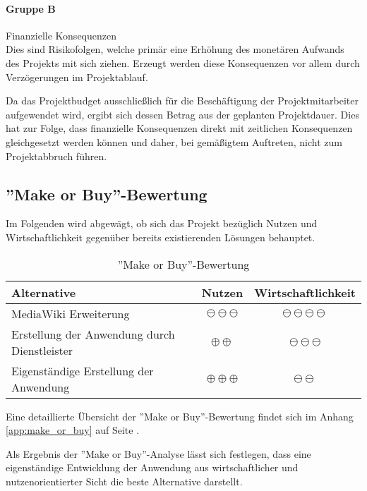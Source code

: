 \documentclass[12pt, xcolor=dvipsnames]{scrartcl}
\begin{document}
\paragraph{Gruppe B} Finanzielle Konsequenzen \\
Dies sind Risikofolgen, welche primär eine Erhöhung des monetären Aufwands des Projekts mit sich ziehen. Erzeugt werden diese Konsequenzen vor allem durch Verzögerungen im Projektablauf.

Da das Projektbudget ausschließlich für die Beschäftigung der Projektmitarbeiter aufgewendet wird, ergibt sich dessen Betrag aus der geplanten Projektdauer. Dies hat zur Folge, dass finanzielle Konsequenzen direkt mit zeitlichen Konsequenzen gleichgesetzt werden können und daher, bei gemäßigtem Auftreten, nicht zum Projektabbruch führen.


\subsection{''Make or Buy''-Bewertung}

Im Folgenden wird abgewägt, ob sich das Projekt bezüglich Nutzen und Wirtschaftlichkeit gegenüber bereits existierenden Lösungen behauptet.


\begin{table}[H]
	\centering
	\begin{tabular}{lcc}

		\rowcolor{white!15}				
		\textbf{Alternative} & \textbf{Nutzen} & \textbf{Wirtschaftlichkeit} \\\hline		
				
		MediaWiki Erweiterung & $\ominus\ominus\ominus$ & $\ominus\ominus\ominus\ominus$ \\		
		Erstellung der Anwendung durch Dienstleister & $\oplus\oplus$ & $\ominus\ominus\ominus$ \\		
		Eigenständige Erstellung der Anwendung & $\oplus\oplus\oplus$ & $\ominus\ominus$ \\
	
			    
	\end{tabular}
	\caption{''Make or Buy''-Bewertung}
	\label{tab:make_or_buy}
\end{table}

Eine detaillierte Übersicht der ''Make or Buy''-Bewertung findet sich im Anhang \ref{app:make_or_buy} auf Seite \pageref{app:make_or_buy}.


Als Ergebnis der ''Make or Buy''-Analyse lässt sich festlegen, dass eine eigenständige Entwicklung der Anwendung aus wirtschaftlicher und nutzenorientierter Sicht die beste Alternative darstellt.
\end{document}
